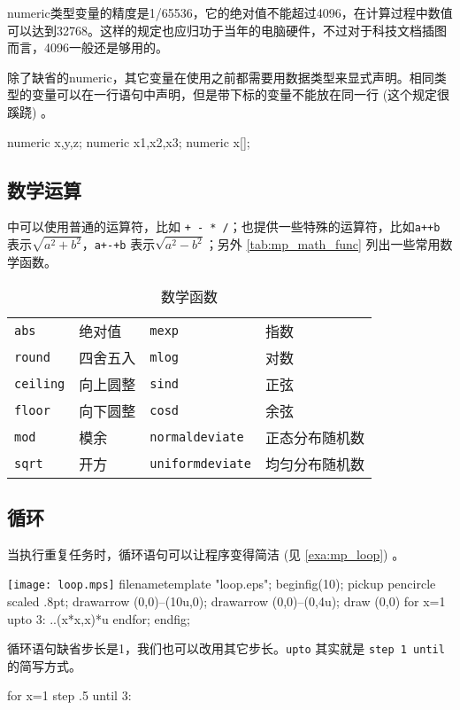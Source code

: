 numeric类型变量的精度是1/65536，它的绝对值不能超过4096，在计算过程中数值可以达到32768。这样的规定也应归功于当年的电脑硬件，不过对于科技文档插图而言，4096一般还是够用的。

除了缺省的numeric，其它变量在使用之前都需要用数据类型来显式声明。相同类型的变量可以在一行语句中声明，但是带下标的变量不能放在同一行 (这个规定很蹊跷) 。

\begin{Code}
numeric x,y,z;    %
numeric x1,x2,x3; %
numeric x[];      %
\end{Code}

\subsection{数学运算}

\MP 中可以使用普通的运算符，比如 \verb|+ - * /|；也提供一些特殊的运算符，比如\verb|a++b| 表示$\sqrt{a^2+b^2}$，\verb|a+-+b| 表示$\sqrt{a^2-b^2}$；另外 \autoref{tab:mp_math_func} 列出一些常用数学函数。

\begin{table}[htbp]
\centering
\caption{\MP 数学函数}
\label{tab:mp_math_func}
\begin{tabular}{llll}
    \toprule
    \texttt{abs}     & 绝对值   & \texttt{mexp} & 指数 \\
    \texttt{round}   & 四舍五入 & \texttt{mlog} & 对数 \\
    \texttt{ceiling} & 向上圆整 & \texttt{sind} & 正弦 \\
    \texttt{floor}   & 向下圆整 & \texttt{cosd} & 余弦 \\
    \texttt{mod}     & 模余     & \texttt{normaldeviate} & 正态分布随机数 \\
    \texttt{sqrt}    & 开方     & \texttt{uniformdeviate} & 均匀分布随机数 \\
    \bottomrule
\end{tabular}
\end{table}

\subsection{循环}

当执行重复任务时，循环语句可以让程序变得简洁 (见 \autoref{exa:mp_loop}) 。

\begin{example}[h]
\begin{FBTDemo}[numbers=left]{\texttt{[image: loop.mps]}}
filenametemplate "loop.eps";
beginfig(10);
pickup pencircle scaled .8pt;
drawarrow (0,0)--(10u,0);
drawarrow (0,0)--(0,4u);
draw (0,0) %
for x=1 upto 3: ..(x*x,x)*u endfor;
endfig;
\end{FBTDemo}
\caption{\MP 循环}
\label{exa:mp_loop}
\end{example}

循环语句缺省步长是1，我们也可以改用其它步长。\texttt{upto} 其实就是 \texttt{step 1 until} 的简写方式。

\begin{Code}[]
for x=1 step .5 until 3: 
\end{Code}



